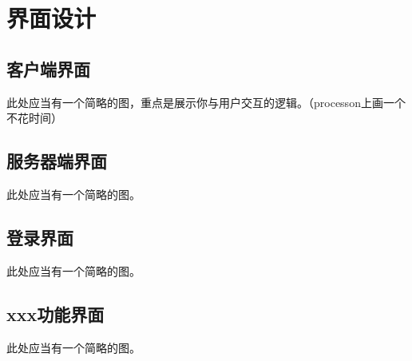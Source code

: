 \chapter{界面设计}
\section{客户端界面}
此处应当有一个简略的图，重点是展示你与用户交互的逻辑。（processon上画一个不花时间）

\section{服务器端界面}
此处应当有一个简略的图。

\section{登录界面}
此处应当有一个简略的图。

\section{xxx功能界面}
此处应当有一个简略的图。
